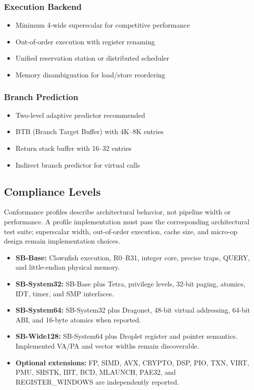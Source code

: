 \documentclass[11pt]{article}
\begin{document}
\subsubsection{Execution Backend}

\begin{itemize}
    \item Minimum 4-wide superscalar for competitive performance
    \item Out-of-order execution with register renaming
    \item Unified reservation station or distributed scheduler
    \item Memory disambiguation for load/store reordering
\end{itemize}

\subsubsection{Branch Prediction}

\begin{itemize}
    \item Two-level adaptive predictor recommended
    \item BTB (Branch Target Buffer) with 4K--8K entries
    \item Return stack buffer with 16--32 entries
    \item Indirect branch predictor for virtual calls
\end{itemize}

\subsection{Compliance Levels}

Conformance profiles describe architectural behavior, not pipeline width or performance. A profile implementation must pass the corresponding architectural test suite; superscalar width, out-of-order execution, cache size, and micro-op design remain implementation choices.

\begin{itemize}
    \item \textbf{SB-Base:} Clownfish execution, R0--R31, integer core, precise traps, QUERY, and little-endian physical memory.
    \item \textbf{SB-System32:} SB-Base plus Tetra, privilege levels, 32-bit paging, atomics, IDT, timer, and SMP interfaces.
    \item \textbf{SB-System64:} SB-System32 plus Dragonet, 48-bit virtual addressing, 64-bit ABI, and 16-byte atomics when reported.
    \item \textbf{SB-Wide128:} SB-System64 plus Droplet register and pointer semantics. Implemented VA/PA and vector widths remain discoverable.
    \item \textbf{Optional extensions:} FP, SIMD, AVX, CRYPTO, DSP, PIO, TXN, VIRT, PMU, SHSTK, IBT, BCD, MLAUNCH, PAE32, and REGISTER\_WINDOWS are independently reported.
\end{itemize}
\end{document}
